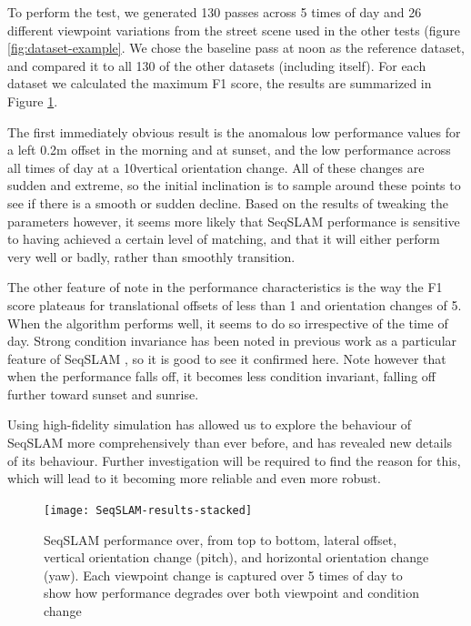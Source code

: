 \documentclass[letterpaper, 10 pt, conference]{ieeeconf}  %
\begin{document}
To perform the test, we generated 130 passes across 5 times of day and 26 different viewpoint variations from the street scene used in the other tests (figure \ref{fig:dataset-example}. We chose the baseline pass at noon as the reference dataset, and compared it to all 130 of the other datasets (including itself). For each dataset we calculated the maximum F1 score, the results are summarized in Figure \ref{fig:seqslam-results-stacked}.

The first immediately obvious result is the anomalous low performance values for a left 0.2m offset in the morning and at sunset, and the low performance across all times of day at a 10\degree vertical orientation change.  All of these changes are sudden and extreme, so the initial inclination is to sample around these points to see if there is a smooth or sudden decline. Based on the results of tweaking the parameters however, it seems more likely that SeqSLAM performance is sensitive to having achieved a certain level of matching, and that it will either perform very well or badly, rather than smoothly transition.

The other feature of note in the performance characteristics is the way the F1 score plateaus for translational offsets of less than 1 and orientation changes of 5\degree. When the algorithm performs well, it seems to do so irrespective of the time of day. Strong condition invariance has been noted in previous work as a particular feature of SeqSLAM \cite{Milford2012}, so it is good to see it confirmed here. Note however that when the performance falls off, it becomes less condition invariant, falling off further toward sunset and sunrise.

Using high-fidelity simulation has allowed us to explore the behaviour of SeqSLAM more comprehensively than ever before, and has revealed new details of its behaviour. Further investigation will be required to find the reason for this, which will lead to it becoming more reliable and even more robust.

\begin{figure}[t]
    \texttt{[image: SeqSLAM-results-stacked]}
    \caption{SeqSLAM performance over, from top to bottom, lateral offset, vertical orientation change (pitch), and horizontal orientation change (yaw). Each viewpoint change is captured over 5 times of day to show how performance degrades over both viewpoint and condition change}
    \label{fig:seqslam-results-stacked}
\end{figure}

\end{document}
